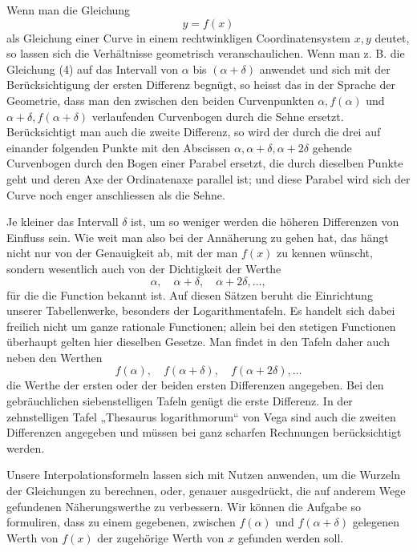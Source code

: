 \documentclass[11pt]{article}
\begin{document}
Wenn man die Gleichung
\[
        y=f(x)
\]
als Gleichung einer Curve in einem rechtwinkligen Coordinatensystem $x,y$ deutet, so lassen sich die Verhältnisse geometrisch veranschaulichen. Wenn man z. B. die Gleichung (4) auf das Intervall von $\alpha$ bis $(\alpha+\delta)$ anwendet und sich mit der Berücksichtigung der ersten Differenz begnügt, so heisst das in der Sprache der Geometrie, dass man den zwischen den beiden Curvenpunkten $\alpha,f(\alpha)$ und $\alpha+\delta,f(\alpha+\delta)$ verlaufenden Curvenbogen durch die Sehne ersetzt. Berücksichtigt man auch die zweite Differenz, so wird der durch die drei auf einander folgenden Punkte mit den Abscissen $\alpha,\alpha+\delta,\alpha+2\delta$ gehende Curvenbogen durch den Bogen einer Parabel ersetzt, die durch dieselben Punkte geht und deren Axe der Ordinatenaxe parallel ist; und diese Parabel wird sich der Curve noch enger anschliessen als die Sehne.

Je kleiner das Intervall $\delta$ ist, um so weniger werden die höheren Differenzen von Einfluss sein. Wie weit man also bei der Annäherung zu gehen hat, das hängt nicht nur von der Genauigkeit ab, mit der man $f(x)$ zu kennen wünscht, sondern wesentlich auch von der Dichtigkeit der Werthe
\[
        \alpha,\quad \alpha+\delta,\quad \alpha+2\delta,\ldots,
\]
für die die Function bekannt ist. Auf diesen Sätzen beruht die Einrichtung unserer Tabellenwerke, besonders der Logarithmentafeln. Es handelt sich dabei freilich nicht um ganze rationale Functionen; allein bei den stetigen Functionen überhaupt gelten hier dieselben Gesetze. Man findet in den Tafeln daher auch neben den Werthen
\[
        f(\alpha),\quad f(\alpha+\delta),\quad f(\alpha+2\delta),\ldots
\]
die Werthe der ersten oder der beiden ersten Differenzen angegeben. Bei den gebräuchlichen siebenstelligen Tafeln genügt die erste Differenz. In der zehnstelligen Tafel „Thesaurus logarithmorum`` von Vega sind auch die zweiten Differenzen angegeben und müssen bei ganz scharfen Rechnungen berücksichtigt werden.

Unsere Interpolationsformeln lassen sich mit Nutzen anwenden, um die Wurzeln der Gleichungen zu berechnen, oder, genauer ausgedrückt, die auf anderem Wege gefundenen Näherungswerthe zu verbessern. Wir können die Aufgabe so formuliren, dass zu einem gegebenen, zwischen $f(\alpha)$ und $f(\alpha+\delta)$ gelegenen Werth von $f(x)$ der zugehörige Werth von $x$ gefunden werden soll.
\end{document}
